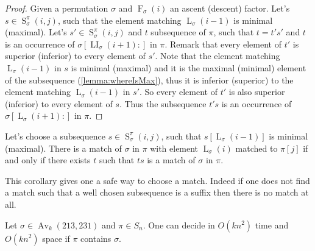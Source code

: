 \documentclass[a4paper]{llncs}
\DeclareMathOperator{\AV}{Av}
\newcommand{\ptext}{\pi}
\newcommand{\pmotif}{\sigma}
\DeclareMathOperator{\firsta}{L}
\newcommand{\first}[2]{\firsta_{{#1}}({#2})}
\DeclareMathOperator{\firstia}{LI}
\newcommand{\firsti}[2]{\firstia_{{#1}}({#2})}
\DeclareMathOperator{\factora}{F}
\newcommand{\factor}[2]{\factora_{{#1}}({#2})}
\DeclareMathOperator{\SETa}{S}
\newcommand{\SET}[4]{\SETa_{{#1}}^{{#2}}({#3},{#4})}
\begin{document}
\begin{proof}
Given a permutation $\pmotif$ and $\factor{\pmotif}{i}$ an ascent (descent) factor.
Let's $s \in \SET{\pmotif}{\ptext}{i}{j}$, such that the element matching $\first{\pmotif}{i-1}$ is minimal (maximal).
Let's $s' \in \SET{\pmotif}{\ptext}{i}{j}$ and $t$ subsequence of $\ptext$, such that $t=t's'$ and $t$ is an occurrence of $\pmotif[\firsti{\pmotif}{i+1}:]$ in $\pi$. 
Remark that every element of $t'$ is superior (inferior) to every element of $s'$.
Note that the element matching $\first{\pmotif}{i-1}$ in $s$ is minimal (maximal) and it is the maximal (minimal) element of the subsequence (\ref{lemma:whereIsMax}), thus
it is inferior (superior) to the element matching $\first{\pmotif}{i-1}$ in $s'$.
So every element of $t'$ is also superior (inferior) to every element of $s$. Thus the subsequence $t's$ is an occurrence of $\pmotif[\first{\pmotif}{i+1}:]$ in $\ptext$.
\end{proof}

\begin{corollary}
Let's choose a subsequence $s \in \SET{\pmotif}{\ptext}{i}{j}$, such that $s[\first{\pmotif}{i-1}]$ is minimal (maximal). There is a match of $\pmotif$ in $\ptext$ with element $\first{\pmotif}{i}$ matched to $\ptext[j]$ if and only if there exists $t$ such that $ts$ is a match of $\pmotif$ in $\ptext$. 
\end{corollary}

This corollary gives one a safe way to choose a match. Indeed if one does not find a match such that a well chosen subsequence is a suffix then there is no match at all.

\begin{proposition}
	\label{Proposition:sigma avoids 213 and 231}
	Let $\sigma \in \AV_k(213,231)$ and $\pi \in S_n$.
	One can decide in $O(kn^2)$ time
	and $O(kn^2)$ space if $\pi$ contains $\sigma$.
\end{proposition}

\end{document}
